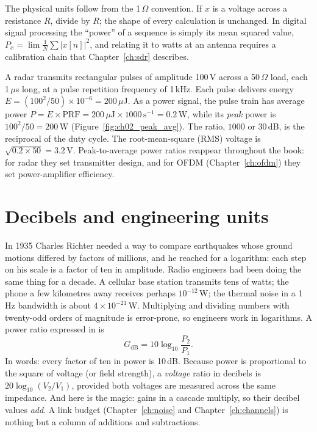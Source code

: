 The physical units follow from the 1\,$\Omega$ convention. If $x$ is a voltage across a resistance
$R$, divide by $R$; the shape of every calculation is unchanged. In digital signal processing the
``power'' of a sequence is simply its mean squared value, $P_x=\lim\frac{1}{N}\sum|x[n]|^2$, and
relating it to watts at an antenna requires a calibration chain that Chapter~\ref{ch:sdr}
describes.

\begin{worked}
A radar transmits rectangular pulses of amplitude 100\,V across a 50\,$\Omega$ load, each
1\,$\mu$s long, at a pulse repetition frequency of 1\,kHz. Each pulse delivers energy
$E=(100^2/50)\times10^{-6}=200\,\mu$J. As a power signal, the pulse train has average power
$P=E\times\text{PRF}=200\,\mu\text{J}\times1000\,\text{s}^{-1}=0.2$\,W, while its \emph{peak}
power is $100^2/50=200$\,W (Figure~\ref{fig:ch02_peak_avg}). The ratio, $1000$ or 30\,dB, is the
reciprocal of the duty cycle. The root-mean-square (RMS) voltage is $\sqrt{0.2\times50}=3.2$\,V.
Peak-to-average power ratios reappear throughout the book: for radar they set transmitter design,
and for OFDM (Chapter~\ref{ch:ofdm}) they set power-amplifier efficiency.
\end{worked}

\section{Decibels and engineering units}
\label{sec:ch02:decibels}

In 1935 Charles Richter needed a way to compare earthquakes whose ground motions differed by
factors of millions, and he reached for a logarithm: each step on his scale is a factor of ten in
amplitude. Radio engineers had been doing the same thing for a decade. A cellular base station
transmits tens of watts; the phone a few kilometres away receives perhaps $10^{-12}$\,W; the
thermal noise in a 1\,Hz bandwidth is about $4\times10^{-21}$\,W. Multiplying and dividing numbers
with twenty-odd orders of magnitude is error-prone, so engineers work in logarithms. A power ratio
expressed in  is
\begin{equation}
G_{\mathrm{dB}}=10\log_{10}\frac{P_2}{P_1}.
\label{eq:ch02:db}
\end{equation}
In words: every factor of ten in power is 10\,dB. Because power is proportional to the square of
voltage (or field strength), a \emph{voltage} ratio in decibels is $20\log_{10}(V_2/V_1)$, provided
both voltages are measured across the same impedance. And here is the magic: gains in a cascade
multiply, so their decibel values \emph{add}. A link budget (Chapter~\ref{ch:noise} and
Chapter~\ref{ch:channels}) is nothing but a column of additions and subtractions.

